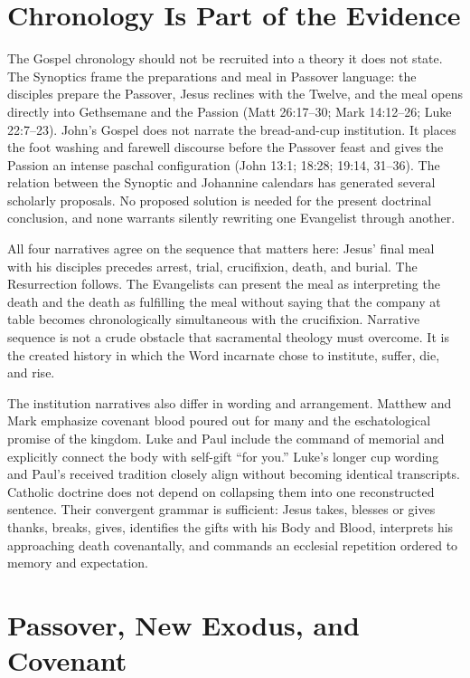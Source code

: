 \begin{deepstudy}
\section{Chronology Is Part of the Evidence}

The Gospel chronology should not be recruited into a theory it does not state.
The Synoptics frame the preparations and meal in Passover language: the
disciples prepare the Passover, Jesus reclines with the Twelve, and the meal
opens directly into Gethsemane and the Passion (Matt 26:17--30; Mark
14:12--26; Luke 22:7--23). John's Gospel does not narrate the bread-and-cup
institution. It places the foot washing and farewell discourse before the
Passover feast and gives the Passion an intense paschal configuration (John
13:1; 18:28; 19:14, 31--36). The relation between the Synoptic and Johannine
calendars has generated several scholarly proposals. No proposed solution is
needed for the present doctrinal conclusion, and none warrants silently
rewriting one Evangelist through another.

All four narratives agree on the sequence that matters here: Jesus' final meal
with his disciples precedes arrest, trial, crucifixion, death, and burial. The
Resurrection follows. The Evangelists can present the meal as interpreting the
death and the death as fulfilling the meal without saying that the company at
table becomes chronologically simultaneous with the crucifixion. Narrative
sequence is not a crude obstacle that sacramental theology must overcome. It
is the created history in which the Word incarnate chose to institute,
suffer, die, and rise.

The institution narratives also differ in wording and arrangement. Matthew
and Mark emphasize covenant blood poured out for many and the eschatological
promise of the kingdom. Luke and Paul include the command of memorial and
explicitly connect the body with self-gift ``for you.'' Luke's longer cup
wording and Paul's received tradition closely align without becoming
identical transcripts. Catholic doctrine does not depend on collapsing them
into one reconstructed sentence. Their convergent grammar is sufficient:
Jesus takes, blesses or gives thanks, breaks, gives, identifies the gifts with
his Body and Blood, interprets his approaching death covenantally, and commands
an ecclesial repetition ordered to memory and expectation.

\section{Passover, New Exodus, and Covenant}


\end{deepstudy}
